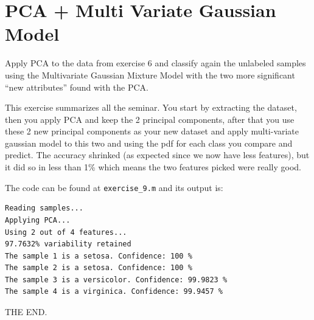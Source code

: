 \documentclass[]{article}
\begin{document}
\pagebreak

\section{PCA + Multi Variate Gaussian Model}

Apply PCA to the data from exercise 6 and classify again the unlabeled samples using the Multivariate Gaussian Mixture Model with the two more significant “new attributes” found with the PCA.

This exercise summarizes all the seminar. You start by extracting the dataset, then you apply PCA and keep the 2 principal components, after that you use these 2 new principal components as your new dataset and apply multi-variate gaussian model to this two and using the pdf for each class you compare and predict. The accuracy shrinked (as expected since we now have less features), but it did so in less than 1\% which means the two features picked were really good.

The code can be found at \texttt{exercise\_9.m} and its output is:

\begin{verbatim}
Reading samples...
Applying PCA...
Using 2 out of 4 features...
97.7632% variability retained
The sample 1 is a setosa. Confidence: 100 %
The sample 2 is a setosa. Confidence: 100 %
The sample 3 is a versicolor. Confidence: 99.9823 %
The sample 4 is a virginica. Confidence: 99.9457 %
\end{verbatim}

\centering
\textsc{THE END.}
\end{document}
